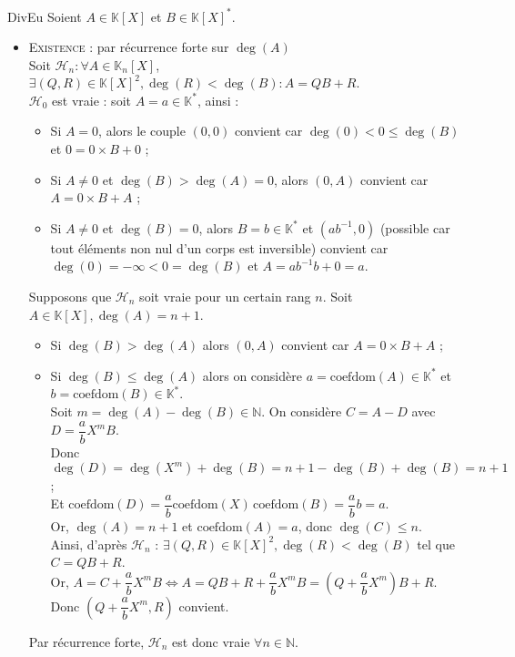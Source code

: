 \documentclass[12pt,a4paper]{report}
\begin{document}
\begin{demonstration}{DivEu}
Soient $A \in \mathbb{K}[X]$ et $B \in \mathbb{K}[X]^*$.
    \begin{itemize}
        \item \textsc{Existence} : par récurrence forte sur $\deg(A)$\\
        Soit $\mathcal{H}_n : \forall A \in \mathbb{K}_n[X]$, $\exists (Q, R) \in \mathbb{K}[X]^2, \deg(R) < \deg(B) : A = QB + R$.\\
        $\mathcal{H}_0$ est vraie : soit $A = a \in \mathbb{K}^*$, ainsi :
        \begin{itemize}
            \item Si $A = 0$, alors le couple $(0, 0)$ convient car $\deg(0) < 0 \leqslant \deg(B)$ et $0 = 0 \times B + 0$ ;
            \item Si $A \neq 0$ et $\deg(B) > \deg(A) = 0$, alors $(0, A)$ convient car $A = 0 \times B + A$ ;
            \item Si $A \neq 0$ et $\deg(B) = 0$, alors $B = b \in \mathbb{K}^*$ et $(ab^{-1}, 0)$ (possible car tout éléments non nul d'un corps est inversible) convient car $\deg(0) = - \infty < 0 = \deg(B)$ et $A = ab^{-1}b + 0 = a$.
        \end{itemize}
        Supposons que $\mathcal{H}_n$ soit vraie pour un certain rang $n$. Soit $A \in \mathbb{K}[X], \deg(A) = n + 1$.
        \begin{itemize}
            \item Si $\deg(B) > \deg(A)$ alors $(0, A)$ convient car $A = 0 \times B + A$ ;
            \item Si $\deg(B) \leqslant \deg(A)$ alors on considère $a = \text{coefdom}(A) \in \mathbb{K}^*$ et $b = \text{coefdom}(B) \in \mathbb{K}^*$.\\
            Soit $m = \deg(A) - \deg(B) \in \mathbb{N}$. On considère $C = A - D$ avec $D = \dfrac{a}{b}X^m B$.\\
            Donc $\deg(D) = \deg(X^m) + \deg(B) = n + 1 - \deg(B) + \deg(B) = n + 1$ ;\\
            Et $\text{coefdom}(D) = \dfrac{a}{b} \text{coefdom}(X) \, \text{coefdom}(B) = \dfrac{a}{b} b = a$.\\
            Or, $\deg(A) = n + 1$ et $\text{coefdom}(A) = a$, donc $\deg(C) \leqslant n$.\\
            Ainsi, d'après $\mathcal{H}_n$ : $\exists (Q, R) \in \mathbb{K}[X]^2, \deg(R) < \deg(B)$ tel que $C = QB + R$.\\
            Or, $A = C + \dfrac{a}{b}X^m B \Leftrightarrow A = QB + R + \dfrac{a}{b}X^m B = \left(Q + \dfrac{a}{b}X^m\right) B + R$. Donc $\left(Q + \dfrac{a}{b}X^m, R\right)$ convient.
        \end{itemize}
        Par récurrence forte, $\mathcal{H}_n$ est donc vraie $\forall n \in \mathbb{N}$.
        

\end{itemize}
\end{demonstration}
\end{document}
